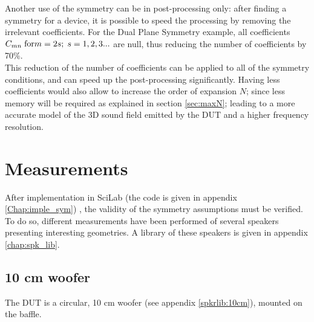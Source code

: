 \documentclass{report}
\begin{document}
Another use of the symmetry can be in post-processing only: after finding a symmetry for a device, it is possible to speed the processing by removing the irrelevant coefficients. For the Dual Plane Symmetry example, all coefficients  $C_{mn} \;  \textup{for}   m = 2s; \; s =1, 2, 3...$ are null, thus reducing the number of coefficients by 70\%.\\
This reduction of the number of coefficients can be applied to all of the symmetry conditions, and can speed up the post-processing significantly. Having less coefficients would also allow to increase the order of expansion $N$; since less memory will be required as explained in section \ref{sec:maxN}; leading to a more accurate model of the 3D sound field emitted by the DUT and a higher frequency resolution.

\newpage

\section{Measurements}

After implementation in SciLab (the code is given in appendix \ref{Chap:imple_sym}) , the validity of the symmetry assumptions must be verified. To do so, different measurements have been performed of several speakers presenting interesting geometries. A library of these speakers is given in appendix \ref{chap:spk_lib}. 


\subsection{10 cm woofer}

The DUT is a circular, 10 cm woofer (see appendix \ref{spkrlib:10cm}), mounted on the baffle. \\
\end{document}
